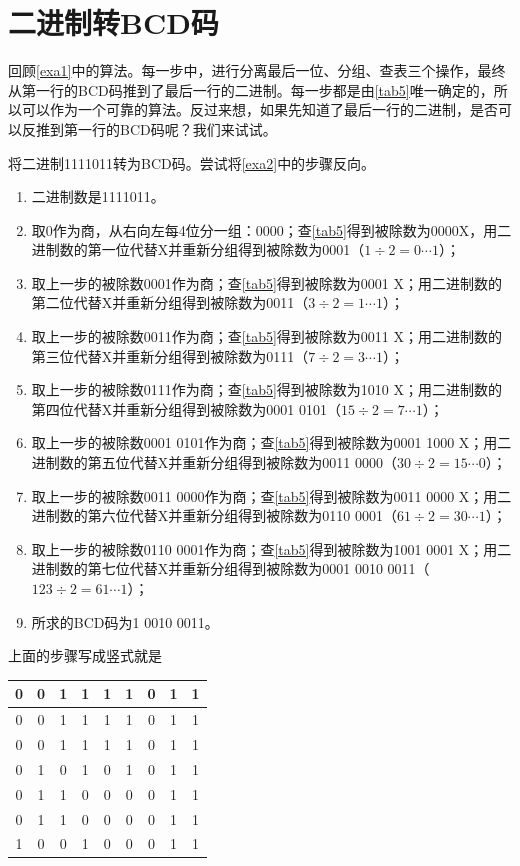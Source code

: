 \section{二进制转BCD码}
回顾\autoref{exa1}中的算法。每一步中，进行分离最后一位、分组、查表三个操作，最终从第一行的BCD码推到了最后一行的二进制。每一步都是由\autoref{tab5}唯一确定的，所以可以作为一个可靠的算法。反过来想，如果先知道了最后一行的二进制，是否可以反推到第一行的BCD码呢？我们来试试。
\begin{example}
将二进制1111011转为BCD码。尝试将\autoref{exa2}中的步骤反向。
\begin{enumerate}
\item 二进制数是1111011。
\item 取0作为商，从右向左每4位分一组：0000；查\autoref{tab5}得到被除数为0000X，用二进制数的第一位代替X并重新分组得到被除数为0001（$1\div 2=0\cdots 1$）；
\item 取上一步的被除数0001作为商；查\autoref{tab5}得到被除数为0001 X；用二进制数的第二位代替X并重新分组得到被除数为0011（$3\div 2=1\cdots 1$）；
\item 取上一步的被除数0011作为商；查\autoref{tab5}得到被除数为0011 X；用二进制数的第三位代替X并重新分组得到被除数为0111（$7\div 2=3\cdots 1$）；
\item 取上一步的被除数0111作为商；查\autoref{tab5}得到被除数为1010 X；用二进制数的第四位代替X并重新分组得到被除数为0001 0101（$15\div 2=7\cdots 1$）；
\item 取上一步的被除数0001 0101作为商；查\autoref{tab5}得到被除数为0001 1000 X；用二进制数的第五位代替X并重新分组得到被除数为0011 0000（$30\div 2=15\cdots 0$）；
\item 取上一步的被除数0011 0000作为商；查\autoref{tab5}得到被除数为0011 0000 X；用二进制数的第六位代替X并重新分组得到被除数为0110 0001（$61\div 2=30\cdots 1$）；
\item 取上一步的被除数0110 0001作为商；查\autoref{tab5}得到被除数为1001 0001 X；用二进制数的第七位代替X并重新分组得到被除数为0001 0010 0011（$123\div 2=61\cdots 1$）；
\item 所求的BCD码为1 0010 0011。
\end{enumerate}
上面的步骤写成竖式就是
\begin{center}
\begin{tabular}{|ccccccccc|}
\hline
0&0&1&\multicolumn{1}{|c}{1}&1&1&0&1&1\\\hline
0&0&1&1&\multicolumn{1}{|c}{1}&1&0&1&1\\\hline
0&0&1&1&1&\multicolumn{1}{|c}{1}&0&1&1\\\hline
0&1&\multicolumn{1}{|c}{0}&1&0&1&\multicolumn{1}{|c}{0}&1&1\\\hline
0&1&1&\multicolumn{1}{|c}{0}&0&0&0&\multicolumn{1}{|c}{1}&1\\\hline
0&1&1&0&\multicolumn{1}{|c}{0}&0&0&1&\multicolumn{1}{|c|}{1}\\\hline
1&\multicolumn{1}{|c}{0}&0&1&0&\multicolumn{1}{|c}{0}&0&1&1\\\hline
\end{tabular}
\end{center}
\end{example}